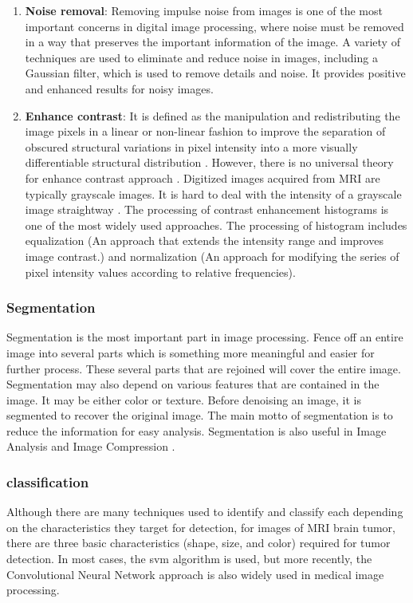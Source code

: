 \begin{enumerate}
  \item \textbf{Noise removal}: Removing impulse noise from images is one of the most important concerns in digital image processing, where noise must be removed in a way that preserves the important information of the image. A variety of techniques are used to eliminate and reduce noise in images, including a Gaussian filter, which is used to remove details and noise. It provides positive and enhanced results for noisy images.
  \item \textbf{Enhance contrast}: It is defined as the manipulation and redistributing the image pixels in a linear or non-linear fashion to improve the separation of obscured structural variations in pixel intensity into a more visually differentiable structural distribution \cite{yadav2020image}. However, there is no universal theory for enhance contrast approach \cite{nishu2012quantifying}. Digitized images acquired from MRI are typically grayscale images. It is hard to deal with the intensity of a grayscale image straightway \cite{nishu2012quantifying}. The processing of contrast enhancement histograms is one of the most widely used approaches. The processing of histogram includes equalization (An approach that extends the intensity range and improves image contrast.) and normalization (An approach for modifying the series of pixel intensity values according to relative frequencies).
\end{enumerate}

\subsubsection{Segmentation}
Segmentation is the most important part in image processing. Fence
off an entire image into several parts which is something more meaningful
and easier for further process. These several parts that are rejoined will
cover the entire image. Segmentation may also depend on various features
that are contained in the image. It may be either color or texture. Before
denoising an image, it is segmented to recover the original image. The
main motto of segmentation is to reduce the information for easy analysis.
Segmentation is also useful in Image Analysis and Image Compression \cite{yogamangalam2013segmentation}.

\subsubsection{classification}
Although there are many techniques used to identify and classify each
depending on the characteristics they target for detection, for images of
MRI brain tumor, there are three basic characteristics (shape, size, and
color) required for tumor detection. In most cases, the svm algorithm is
used, but more recently, the Convolutional Neural Network approach is
also widely used in medical image processing.


